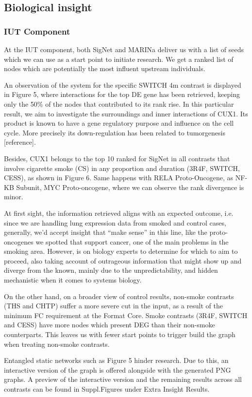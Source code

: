 \subsection{Biological insight}
\subsubsection{IUT Component}
At the IUT component, both SigNet and MARINa deliver us with a list of seeds which we can use as a start point to initiate research. We get a ranked list of nodes which are potentially the most influent upstream individuals.

An observation of the system for the specific SWITCH 4m contrast is displayed in Figure 5, where interactions for the top DE gene has been retrieved, keeping only the 50\% of the nodes that contributed to its rank rise. In this particular result, we aim to investigate the surroundings and inner interactions of CUX1. Its product is known to have a gene regulatory purpose and influence on the cell cycle. More precisely its down-regulation has been related to tumorgenesis [reference].

Besides, CUX1 belongs to the top 10 ranked for SigNet in all contrasts that involve cigarette smoke (CS) in any proportion and duration (3R4F, SWITCH, CESS), as shown in Figure 6. Same happens with RELA Proto-Oncogene, as NF-KB Subunit, MYC Proto-oncogene, where we can observe the rank divergence is minor.

At first sight, the information retrieved aligns with an expected outcome, i.e. since we are handling lung expression data from smoked and control cases, generally, we’d accept insight that “make sense” in this line, like the proto-oncogenes we spotted that support cancer, one of the main problems in the smoking area. However, is on biology experts to determine for which to aim to proceed, also taking account of outrageous information that might show up and diverge from the known, mainly due to the unpredictability, and hidden mechanistic when it comes to systems biology.

On the other hand, on a broader view of control results, non-smoke contrasts (THS and  CHTP) suffer a more severe cut in the input, as a result of the minimum FC requirement at the Format Core. Smoke contrasts (3R4F, SWITCH and CESS) have more nodes which present DEG than their non-smoke counterparts. This leaves us with fewer start points to trigger build the graph when treating non-smoke contrasts.

Entangled static networks such as Figure 5 hinder research. Due to this, an interactive version of the graph is offered alongside with the generated PNG graphs. A preview of the interactive version and the remaining results across all contrasts can be found in Suppl.Figures under Extra Insight Results.

